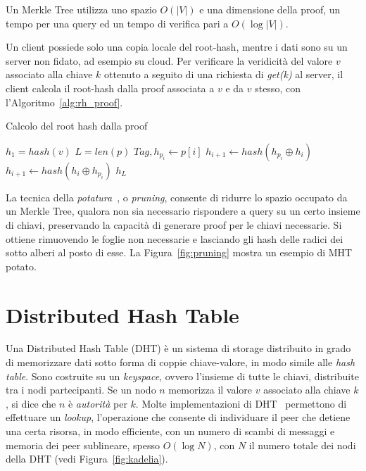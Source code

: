 Un Merkle Tree utilizza uno spazio $O(|V|)$ e una dimensione della proof, un tempo per una query ed un tempo di verifica pari a $O(\log{|V|})$.

Un client possiede solo una copia locale del root-hash, mentre i dati sono su un server non fidato, ad esempio su cloud. Per verificare la veridicità del valore $v$ associato alla chiave $k$ ottenuto a seguito di una richiesta di \emph{get(k)} al server, il client calcola il root-hash dalla proof associata a $v$ e da $v$ stesso, con l'Algoritmo~\ref{alg:rh_proof}.

\begin{algorithm}
	\caption{Calcolo del root hash dalla proof}
	\begin{algorithmic}
			\State $h_1 = hash(v)$
			\State $L = len(p)$
				\State $Tag, h_{p_i} \leftarrow p[i]$
					\State $h_{i+1} \leftarrow hash(h_{p_i} \oplus h_i)$	
				\Else
					\State $h_{i+1} \leftarrow hash(h_i \oplus h_{p_i})$				
				\EndIf
			\EndFor
			\Return $h_L$
		\EndProcedure
	\end{algorithmic}
	\label{alg:rh_proof}
\end{algorithm}

La tecnica della \emph{potatura}~\cite{ponnapalli2019scalable}, o \emph{pruning}, consente di ridurre lo spazio occupato da un Merkle Tree, qualora non sia necessario rispondere a query su un certo insieme di chiavi, preservando la capacità di generare proof per le chiavi necessarie. Si ottiene rimuovendo le foglie non necessarie e lasciando gli hash delle radici dei sotto alberi al posto di esse. La Figura~\ref{fig:pruning} mostra un esempio di MHT potato.

\section{Distributed Hash Table}

Una Distributed Hash Table (DHT) è un sistema di storage distribuito in grado di memorizzare dati sotto forma di coppie chiave-valore, in modo simile alle \emph{hash table}. Sono costruite su un \emph{keyspace}, ovvero l'insieme di tutte le chiavi, distribuite tra i nodi partecipanti. Se un nodo $n$ memorizza il valore $v$ associato alla chiave $k$, si dice che $n$ è \emph{autorità} per $k$. Molte implementazioni di DHT~\cite{maymounkov2002kademlia, ratnasamy2001scalable, stoica2001chord, zhao2004tapestry} permettono di effettuare un \emph{lookup}, l'operazione che consente di individuare il peer che detiene una certa risorsa, in modo efficiente, con un numero di scambi di messaggi e memoria dei peer sublineare, spesso $O(\log N)$, con $N$ il numero totale dei nodi della DHT (vedi Figura~\ref{fig:kadelia}).

